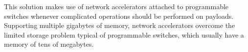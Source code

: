 This solution makes use of network accelerators attached to programmable switches whenever complicated operations should be performed on payloads.\\
Supporting multiple gigabytes of memory, network accelerators overcome the limited storage problem typical of programmable switches, which usually have a memory of tens of megabytes.
